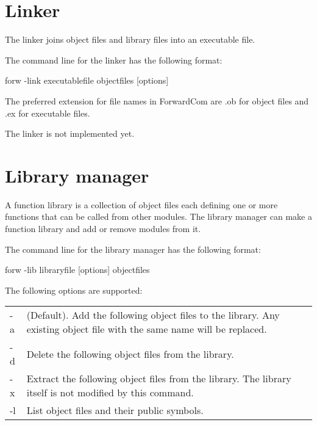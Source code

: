 \documentclass[forwardcom.tex]{subfiles}
\begin{document}
\section{Linker} \label{linker}

The linker joins object files and library files into an executable file.

The command line for the linker has the following format:
\vspace{2mm}

\hspace{5mm} {\ttfamily forw -link executablefile objectfiles [options]}
\vspace{2mm}

The preferred extension for file names in ForwardCom are .ob for object files and .ex for executable files.
\vspace{2mm}

The linker is not implemented yet.


\section{Library manager} \label{libraryManager}

A function library is a collection of object files each defining one or more functions that can be called from other modules. The library manager can make a function library and add or remove modules from it.
\vspace{2mm}

The command line for the library manager has the following format:
\vspace{2mm}

\hspace{5mm} {\ttfamily forw -lib libraryfile [options] objectfiles}
\vspace{2mm}

The following options are supported:\\
\begin{tabular}{|p{10mm}p{150mm}|}
\hline
-a & (Default). Add the following object files to the library. Any existing object file with the same name will be replaced.\\
-d & Delete the following object files from the library.\\
-x & Extract the following object files from the library. The library itself is not modified by this command.\\
-l & List object files and their public symbols.\\
\hline
\end{tabular}
\vspace{2mm}
\end{document}
